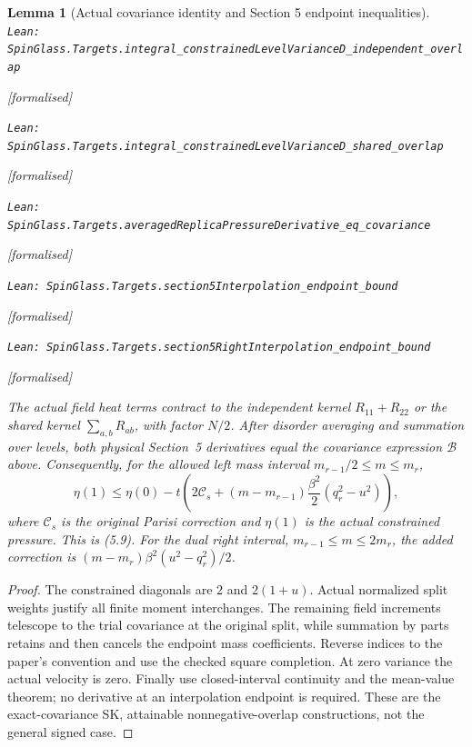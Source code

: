 \documentclass[11pt]{article}
\providecommand{\lean}[1]{\leavevmode\par\nopagebreak
  {\noindent\normalfont\footnotesize\raggedright\texttt{Lean: #1}\par}\nopagebreak}
\providecommand{\leanok}{\par\nopagebreak
  {\noindent\normalfont\footnotesize\textcolor{green!50!black}{[formalised]}\par}\nopagebreak}
\newtheorem{lemma}[theorem]{Lemma}
\begin{document}
\begin{lemma}[Actual covariance identity and Section 5 endpoint inequalities]
\lean{SpinGlass.Targets.integral\_constrainedLevelVarianceD\_independent\_overlap}\leanok
\lean{SpinGlass.Targets.integral\_constrainedLevelVarianceD\_shared\_overlap}\leanok
\lean{SpinGlass.Targets.averagedReplicaPressureDerivative\_eq\_covariance}\leanok
\lean{SpinGlass.Targets.section5Interpolation\_endpoint\_bound}\leanok
\lean{SpinGlass.Targets.section5RightInterpolation\_endpoint\_bound}\leanok
The actual field heat terms contract to the independent kernel
$R_{11}+R_{22}$ or the shared kernel $\sum_{a,b}R_{ab}$, with factor $N/2$.
After disorder averaging and summation over levels, both physical Section~5
derivatives equal the covariance expression $\mathcal B$ above. Consequently,
for the allowed left mass interval $m_{r-1}/2\le m\le m_r$,
\[
 \eta(1)\le\eta(0)-t\left(2\mathcal C_s+
 (m-m_{r-1})\frac{\beta^2}{2}(q_r^2-u^2)\right),
\]
where $\mathcal C_s$ is the original Parisi correction and
$\eta(1)$ is the actual constrained pressure. This is (5.9).
For the dual right interval, $m_{r-1}\le m\le2m_r$, the added correction is
$(m-m_r)\beta^2(u^2-q_r^2)/2$.
\end{lemma}
\begin{proof}
The constrained diagonals are $2$ and $2(1+u)$. Actual normalized split
weights justify all finite moment interchanges. The remaining field
increments telescope to the trial covariance at the original split, while
summation by parts retains and then cancels the endpoint mass coefficients.
Reverse indices to the paper's convention and use the checked square
completion. At zero variance the actual velocity is zero. Finally use
closed-interval continuity and the mean-value theorem; no derivative at an
interpolation endpoint is required. These are the exact-covariance SK,
attainable nonnegative-overlap constructions, not the general signed case.
\end{proof}
\end{document}
